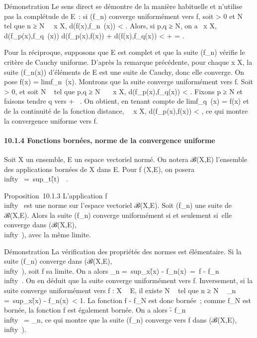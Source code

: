 \documentclass[]{article}
\begin{document}
Démonstration Le sens direct se démontre de la manière habituelle et
n'utilise pas la complétude de E~: si (f_n) converge
uniformément vers f, soit \epsilon \textgreater{} 0 et N \in {}~ tel que n ≥ N
\rigtharrow~\forall~x \in X, d(f(x),f_n~(x)) \textless{}
\epsilon {} . Alors, si p,q ≥ N, on a
\forall~x \in X, d(f_p(x),f_q~(x)) \leq
d(f_p(x),f(x)) + d(f(x),f_q(x)) \textless{} \epsilon
{} + \epsilon {} = \epsilon.

Pour la réciproque, supposons que E est complet et que la suite
(f_n) vérifie le critère de Cauchy uniforme. D'après la
remarque précédente, pour chaque x \in X, la suite (f_n(x))
d'éléments de E est une suite de Cauchy, donc elle converge. On pose
f(x) = limf_n~(x). Montrons que la
suite converge uniformément vers f. Soit \epsilon \textgreater{} 0, et soit N \in
{}~ tel que p,q ≥ N \rigtharrow~\forall~~x \in X,
d(f_p(x),f_q(x)) \textless{} \epsilon {} . Fixons p ≥ N et faisons tendre q vers + \infty~. On obtient, en tenant
compte de limf_q~(x) = f(x) et de la
continuité de la fonction distance, \forall~~x \in X,
d(f_p(x),f(x)) \leq \epsilon {} \textless{} \epsilon, ce
qui montre la convergence uniforme vers f.

\paragraph{10.1.4 Fonctions bornées, norme de la convergence uniforme}

Soit X un ensemble, E un espace vectoriel normé. On notera ℬ(X,E)
l'ensemble des applications bornées de X dans E. Pour f (X,E), on
posera \f\\infty~
=\
sup_t\inX\f(t)\
\in {}~.

Proposition~10.1.3 L'application
f\mapsto~\f\\infty~
est une norme sur l'espace vectoriel ℬ(X,E). Soit (f_n) une
suite de ℬ(X,E). Alors la suite (f_n) converge uniformément si
et seulement si~elle converge dans (ℬ(X,E),\
\\infty~), avec la même limite.

Démonstration La vérification des propriétés des normes est élémentaire.
Si la suite (f_n) converge dans
(ℬ(X,E),\ \\infty~), soit f
sa limite. On a alors \mu_n =\
sup_x\inX\f(x) -
f_n(x)\ =\ f
- f_n\\infty~. On en déduit que la suite
converge uniformément vers f. Inversement, si la suite converge
uniformément vers f : X \rightarrow~ E, il existe N \in {}~ tel que n ≥ N \rigtharrow~
\mu_n =\
sup_x\inX\f(x) -
f_n(x)\ \textless{} 1. La fonction f -
f_N est donc bornée~; comme f_N est bornée, la
fonction f est également bornée. On a alors \f
- f_n\\infty~ = \mu_n, ce qui montre
que la suite (f_n) converge vers f dans
(ℬ(X,E),\ \\infty~).
\end{document}
